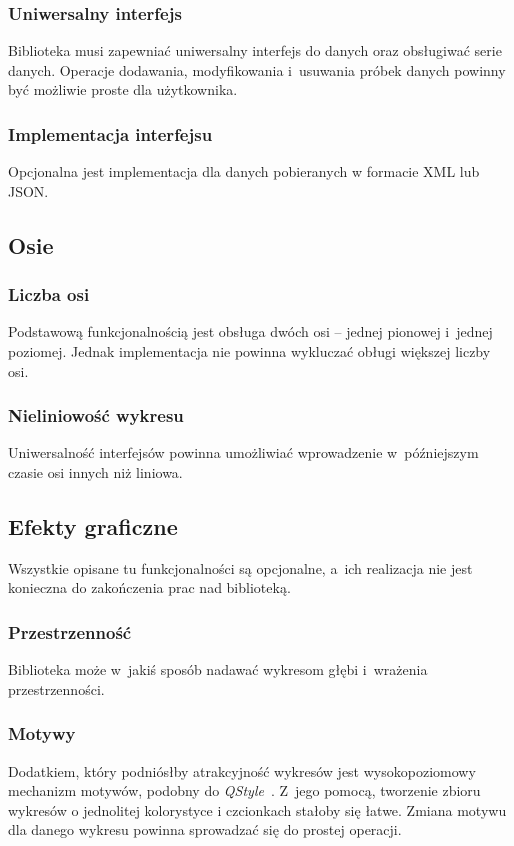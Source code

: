 \documentclass[11pt,twoside,a4paper,final]{article}
\begin{document}
\subsubsection{Uniwersalny interfejs}
Biblioteka musi zapewniać uniwersalny interfejs do danych oraz obsługiwać serie danych. Operacje dodawania, modyfikowania i~usuwania próbek danych powinny być możliwie proste dla użytkownika.

\subsubsection{Implementacja interfejsu} Opcjonalna jest implementacja dla danych pobieranych w formacie XML lub JSON.

\subsection{Osie}

\subsubsection{Liczba osi}
Podstawową funkcjonalnością jest obsługa dwóch osi -- jednej pionowej i~jednej poziomej. Jednak implementacja nie powinna wykluczać obługi większej liczby osi. 

\subsubsection{Nieliniowość wykresu}
Uniwersalność interfejsów powinna umożliwiać wprowadzenie w~późniejszym czasie osi innych niż liniowa.

\subsection{Efekty graficzne}
Wszystkie opisane tu funkcjonalności są opcjonalne, a~ich realizacja nie jest konieczna do zakończenia prac nad biblioteką.

\subsubsection{Przestrzenność}
Biblioteka może w~jakiś sposób nadawać wykresom głębi i~wrażenia przestrzenności. 

\subsubsection{Motywy}
Dodatkiem, który podniósłby atrakcyjność wykresów jest wysokopoziomowy mechanizm motywów, podobny do \textit{QStyle}~\cite{qstyle}. Z~jego pomocą, tworzenie zbioru wykresów o jednolitej kolorystyce i czcionkach stałoby się łatwe. Zmiana motywu dla danego wykresu powinna sprowadzać się do prostej operacji.
\end{document}
